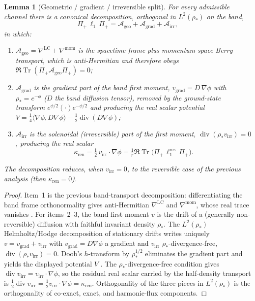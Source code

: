 \documentclass[11pt]{article}
\newtheorem{lemma}[theorem]{Lemma}
\theoremstyle{definition}
\theoremstyle{remark}
\newcommand{\Tr}{\operatorname{Tr}}
\newcommand{\ren}{\mathrm{ren}}
\newcommand{\rstar}{\rho_*}
\DeclareMathOperator{\dive}{div}
\newcommand{\kren}{\kappa_{\ren}}
\newcommand{\Pip}{\Pi_+}
\begin{document}
\begin{lemma}[Geometric / gradient / irreversible split]
\label{lem:canonical-drift-split}
For every admissible channel there is a canonical decomposition, orthogonal in
$L^2(\rstar)$ on the band,
\[
 \Pip\,\ell_1\,\Pip
 =\mathcal A_{\mathrm{geo}}
 +\mathcal A_{\mathrm{grad}}
 +\mathcal A_{\mathrm{irr}},
\]
in which:
\begin{enumerate}[leftmargin=2.6em]
\item $\mathcal A_{\mathrm{geo}}=\nabla^{\mathrm{LC}}+\nabla^{\mathrm{mom}}$ is the
spacetime-frame plus momentum-space Berry transport, which is anti-Hermitian and
therefore obeys $\Re\Tr(\Pip\mathcal A_{\mathrm{geo}}\Pip)=0$;
\item $\mathcal A_{\mathrm{grad}}$ is the gradient part of the band first moment,
$v_{\mathrm{grad}}=D\,\nabla\phi$ with $\rstar=e^{-\phi}$ \textup{(}$D$ the band
diffusion tensor\textup{)}, removed by the ground-state transform
$e^{\phi/2}(\cdot)e^{-\phi/2}$ and producing the real scalar potential
$V=\tfrac14\langle\nabla\phi,D\nabla\phi\rangle-\tfrac12\dive(D\nabla\phi)$;
\item $\mathcal A_{\mathrm{irr}}$ is the solenoidal \textup{(}irreversible\textup{)}
part of the first moment, $\dive(\rstar v_{\mathrm{irr}})=0$, producing the real
scalar
\[
 \kren=\tfrac12\,v_{\mathrm{irr}}\!\cdot\!\nabla\phi
 =\tfrac1r\Re\Tr\bigl(\Pip\,\ell_1^{\mathrm{res}}\,\Pip\bigr).
\]
\end{enumerate}
The decomposition reduces, when $v_{\mathrm{irr}}=0$, to the reversible case of the
previous analysis \textup{(}then $\kren=0$\textup{)}.
\end{lemma}

\begin{proof}
Item~1 is the previous band-transport decomposition: differentiating the
band frame orthonormality gives anti-Hermitian $\nabla^{\mathrm{LC}}$ and
$\nabla^{\mathrm{mom}}$, whose real trace vanishes
\cite{LittlejohnFlynn,EmmrichWeinstein,PST}.  For items~2--3, the band first moment
$v$ is the drift of a (generally non-reversible) diffusion with faithful invariant
density $\rstar$.  The $L^2(\rstar)$ Helmholtz/Hodge decomposition of stationary
drifts \cite{Pavliotis,LelievreStoltz,KipnisLandim} writes uniquely
$v=v_{\mathrm{grad}}+v_{\mathrm{irr}}$ with $v_{\mathrm{grad}}=D\nabla\phi$ a
gradient and $v_{\mathrm{irr}}$ $\rstar$-divergence-free,
$\dive(\rstar v_{\mathrm{irr}})=0$.  Doob's $h$-transform by $\rstar^{1/2}$
eliminates the gradient part and yields the displayed potential $V$
\cite{Doob,Pinsky}.  The $\rstar$-divergence-free condition gives
$\dive v_{\mathrm{irr}}=v_{\mathrm{irr}}\!\cdot\!\nabla\phi$, so the residual
real scalar carried by the half-density transport is
$\tfrac12\dive v_{\mathrm{irr}}=\tfrac12v_{\mathrm{irr}}\!\cdot\!\nabla\phi=\kren$.
Orthogonality of the three pieces in $L^2(\rstar)$ is the orthogonality of
co-exact, exact, and harmonic-flux components.
\end{proof}
\end{document}
